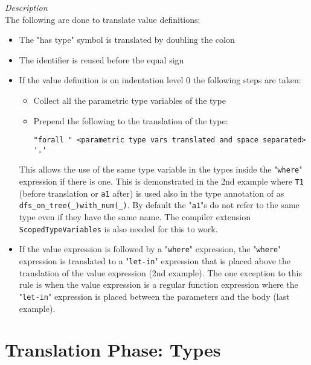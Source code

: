 \documentclass[diploma]{softlab-thesis}
\begin{document}
\begin{itemize}
\textit{Description}\\

The following are done to translate value definitions:

\begin{itemize}
\item
The "has type" symbol is translated by doubling the colon

\item
The identifier is reused before the equal sign

\item
If the value definition is on indentation level 0 the following steps are taken:

\begin{itemize}
\item
Collect all the parametric type variables of the type
\item
Prepend the following to the translation of the type:
\begin{verbatim}
"forall " <parametric type vars translated and space separated> '.'
\end{verbatim}
\end{itemize}

This allows the use of the same type variable in the types inside the
"\texttt{where}" expression if there is one. This is demonstrated in the 2nd
example where \texttt{T1} (before translation or \texttt{a1} after) is used
also in the type annotation of as \verb|dfs_on_tree(_)with_num(_)|. By default
the "\texttt{a1}"s do not refer to the same type even if they have the same
name.  The compiler extension \texttt{ScopedTypeVariables} is also needed for
this to work.

\item
If the value expression is followed by a "\texttt{where}" expression, the
"\texttt{where}" expression is translated to a "\texttt{let-in}" expression
that is placed above the translation of the value expression (2nd example). The
one exception to this rule is when the value expression is a regular
function expression where the "\texttt{let-in}" expression is placed between
the parameters and the body (last example).

\end{itemize}

\end{itemize}

\newpage
\section{Translation Phase: Types}
\end{document}
